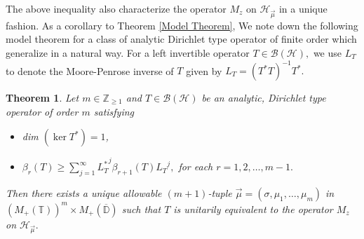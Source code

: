 \documentclass[10pt,oneside,reqno]{amsart}
\newtheorem{theorem}{Theorem}[section]
\theoremstyle{definition}
\theoremstyle{remark}
\newcommand{\D}{\mathbb D}
\numberwithin{equation}{section}
\begin{document}
The above inequality also characterize the operator $M_z$ on $\mathscr H_{\overrightarrow{\mu}}$ in a unique fashion. As a corollary to Theorem \ref{Model Theorem}, We note down the following model theorem for a class of analytic Dirichlet type operator of finite order which generalize \cite[Theorem 1.2]{GGR22} in a natural way. For a left invertible operator $T\in \mathcal B(\mathcal H),$ we use $L_T$ to denote the Moore-Penrose inverse of $T$ given by $L_T=(T^*T)^{-1}T^*.$
\begin{theorem}\label{analytic model}
    Let $m\in \mathbb Z_{\geqslant 1}$ and $T\in \mathcal B(\mathcal H)$ be an analytic, Dirichlet type operator of order $m$ satisfying 
    \begin{itemize}
        \item[\rm (i)] dim $(\ker T^*)=1$, 
        \item[\rm (ii)] $\beta_r(T)\geqslant \sum\limits_{j=1}^{\infty} {L_T^{*}}^j \beta_{r+1}(T) {L_T}^j,$ for each $r=1,2,\ldots,m-1.$
    \end{itemize}
    Then there exists a unique allowable $(m+1)$-tuple  $\overrightarrow{\mu} = \left( \sigma, \mu_{1}, \ldots ,\mu_{m} \right)$ in $\left(M_+(\mathbb T)\right) ^m \times M_+(\overline{\D})$ such that $T$ is unitarily equivalent to the operator $M_z$ on $\mathscr H_{\overrightarrow{\mu}}.$
\end{theorem}
\end{document}
